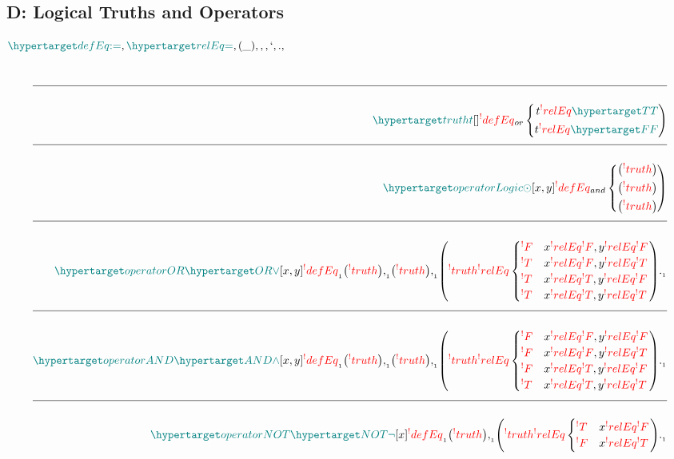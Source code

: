 \documentclass[a4paper]{article}
\newcommand{\TODO}[1]{\colorbox{lime}{\text{#1}}}
\newcommand{\n}{\\[1.5ex] \hline \nonumber \\[0ex]}
\def\ml{\mleft}
\def\mr{\mright}
\newcommand{\cusand}{,}
\newcommand{\cusor}{`}
\newcommand{\cusend}{.}
\newcommand{\cusnum}[2]{{#1}_{{\phantom{ }}_{#2}}}
\newenvironment{defAnd}
  {{}_{and}\left\lbrace\begin{aligned}}
  {\end{aligned}\right)}
\newenvironment{defOr}
  {{}_{or}\left\lbrace\begin{aligned}}
  {\end{aligned}\right)}
\begin{document}
\subsection{D: Logical Truths and Operators}
\TODO{undefined terms:} $%
    \dfn{defEq}[:=], %
    \dfn{relEq}[=], %
    (\_), %
    \cusand, %
    \cusor, %
    \cusend, %
$
\begin{tcolorbox}
\begin{align}
    \n \dfn{truth} [t][] \rfr{defEq}
        \begin{defOr}
                t \rfr{relEq} \dfn{T}
            \\  t \rfr{relEq} \dfn{F}
        \end{defOr}
    \n \dfn{operatorLogic} [\odot][x, y] \rfr{defEq} 
        \begin{defAnd}
                \ml(\rfr{truth} [x][]\mr)
            \\  \ml(\rfr{truth} [y][]\mr)
            \\  \ml(\rfr{truth} [x \odot y][]\mr)
        \end{defAnd}
    \n \dfn{operatorOR} [\dfn{OR}[\lor]][x, y] \cusnum{\rfr{defEq}}{1} \ml(\rfr{truth} [x][]\mr) \cusnum{\cusand}{1} \ml(\rfr{truth} [y][]\mr) \cusnum{\cusand}{1} \ml(\rfr{truth} [x \rfr{OR} y][] \rfr{relEq} \begin{cases} \rfr{F} & x \rfr{relEq} \rfr{F} \cusand y \rfr{relEq} \rfr{F} \\ \rfr{T} & x \rfr{relEq} \rfr{F} \cusand y \rfr{relEq} \rfr{T} \\ \rfr{T} & x \rfr{relEq} \rfr{T} \cusand y \rfr{relEq} \rfr{F} \\ \rfr{T} & x \rfr{relEq} \rfr{T} \cusand y \rfr{relEq} \rfr{T} \end{cases}\mr) \cusnum{\cusend}{1}
    \n \dfn{operatorAND} [\dfn{AND}[\land]][x, y] \cusnum{\rfr{defEq}}{1} \ml(\rfr{truth} [x][]\mr) \cusnum{\cusand}{1} \ml(\rfr{truth} [y][]\mr) \cusnum{\cusand}{1} \ml(\rfr{truth} [x \rfr{AND} y][] \rfr{relEq} \begin{cases} \rfr{F} & x \rfr{relEq} \rfr{F} \cusand y \rfr{relEq} \rfr{F} \\ \rfr{F} & x \rfr{relEq} \rfr{F} \cusand y \rfr{relEq} \rfr{T} \\ \rfr{F} & x \rfr{relEq} \rfr{T} \cusand y \rfr{relEq} \rfr{F} \\ \rfr{T} & x \rfr{relEq} \rfr{T} \cusand y \rfr{relEq} \rfr{T} \end{cases}\mr) \cusnum{\cusend}{1}
    \n \dfn{operatorNOT} [\dfn{NOT}[\lnot]][x] \cusnum{\rfr{defEq}}{1} \ml(\rfr{truth} [x][]\mr) \cusnum{\cusand}{1} \ml(\rfr{truth} [\rfr{NOT} x][] \rfr{relEq} \begin{cases} \rfr{T} & x \rfr{relEq} \rfr{F} \\ \rfr{F} & x \rfr{relEq} \rfr{T} \end{cases}\mr) \cusnum{\cusend}{1} 

\end{align}
\end{tcolorbox}
\end{document}
